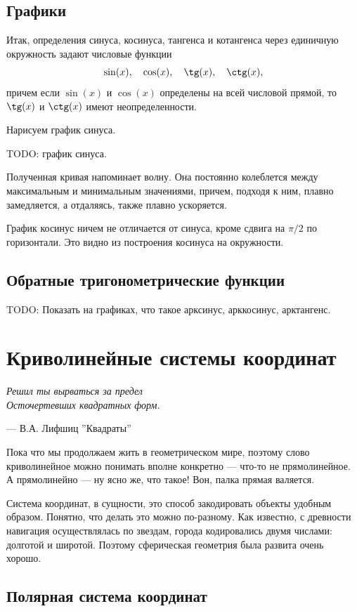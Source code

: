 \documentclass[a4paper,12pt]{article}
\begin{document}
\subsection*{Графики}
Итак, определения синуса, косинуса, тангенса и котангенса через единичную окружность задают числовые функции
\[\sin(x), \quad \cos(x),\quad \tg(x), \quad \ctg(x),\]
причем если $\sin(x)$ и $\cos(x)$ определены на всей числовой прямой, то $\tg(x)$ и $\ctg(x)$ имеют неопределенности.

Нарисуем график синуса.

TODO: график синуса.

Полученная кривая напоминает волну. Она постоянно колеблется между максимальным и минимальным значениями, причем, подходя к ним, плавно замедляется, а отдаляясь, также плавно ускоряется.

График косинус ничем не отличается от синуса, кроме сдвига на $\pi/2$ по горизонтали. Это видно из построения косинуса на окружности.

\subsection*{Обратные тригонометрические функции}

TODO: Показать на графиках, что такое арксинус, арккосинус, арктангенс.

\section*{Криволинейные системы координат}
\epigraph{\textit{Решил ты вырваться за предел \\
Осточертевших квадратных форм.}}{— В.А. Лифшиц ''Квадраты''}

Пока что мы продолжаем жить в геометрическом мире, поэтому слово криволинейное можно понимать вполне конкретно --- что-то не прямолинейное. А прямолинейно --- ну ясно же, что такое! Вон, палка прямая валяется.

Система координат, в сущности, это способ закодировать объекты удобным образом. Понятно, что делать это можно по-разному. Как известно, с древности навигация осуществлялась по звездам, города кодировались двумя числами: долготой и широтой. Поэтому сферическая геометрия была развита очень хорошо.

\subsection*{Полярная система координат}
\end{document}
